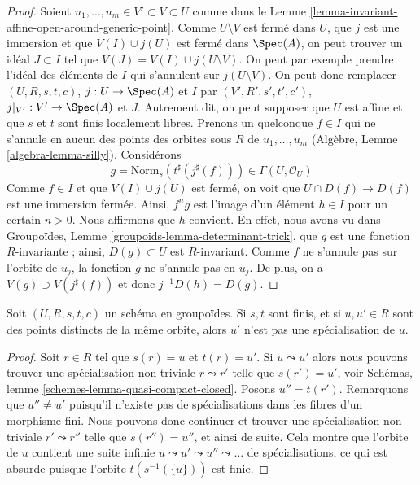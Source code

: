 \begin{proof}
Soient $u_1, \ldots, u_m \in V' \subset V \subset U$ comme dans le
Lemme \ref{lemma-invariant-affine-open-around-generic-point}.
Comme $U \setminus V$ est fermé dans $U$, que $j$ est une immersion et que $V(I) \cup j(U)$
est fermé dans $\Spec(A)$, on peut trouver un idéal
$J \subset I$ tel que $V(J) = V(I) \cup j(U \setminus V)$.
On peut par exemple prendre l'idéal des éléments de $I$ qui
s'annulent sur $j(U \setminus V)$. On peut donc remplacer
$(U, R, s, t, c)$, $j : U \to \Spec(A)$ et $I$ par
$(V', R', s', t', c')$, $j|_{V'} : V' \to \Spec(A)$ et $J$.
Autrement dit, on peut supposer que $U$ est affine et que
$s$ et $t$ sont finis localement libres.
Prenons un quelconque $f \in I$ qui ne s'annule en aucun des
points des orbites sous $R$ de $u_1, \ldots, u_m$
(Algèbre, Lemme \ref{algebra-lemma-silly}). Considérons
$$
g = \text{Norm}_s(t^\sharp(j^\sharp(f))) \in \Gamma(U, \mathcal{O}_U)
$$
Comme $f \in I$ et que $V(I) \cup j(U)$ est fermé, on voit que
$U \cap D(f) \to D(f)$ est une immersion fermée. Ainsi, $f^ng$ est
l'image d'un élément $h \in I$ pour un certain $n > 0$. Nous affirmons que $h$ convient.
En effet, nous avons vu dans
Groupoïdes, Lemme \ref{groupoids-lemma-determinant-trick},
que $g$ est une fonction $R$-invariante ; ainsi, $D(g) \subset U$
est $R$-invariant. Comme $f$ ne s'annule pas sur l'orbite de $u_j$,
la fonction $g$ ne s'annule pas en $u_j$. De plus, on a
$V(g) \supset V(j^\sharp(f))$ et donc $j^{-1}D(h) = D(g)$.
\end{proof}

\begin{lemma}
\label{lemma-no-specializations-map-to-same-point}
Soit $(U, R, s, t, c)$ un schéma en groupoïdes. Si $s, t$ sont finis,
et si $u, u' \in R$ sont des points distincts de la même orbite,
alors $u'$ n'est pas une spécialisation de $u$.
\end{lemma}

\begin{proof}
Soit $r \in R$ tel que $s(r) = u$ et $t(r) = u'$. Si $u \leadsto u'$
alors nous pouvons trouver une spécialisation non triviale $r \leadsto r'$ telle que
$s(r') = u'$, voir 
Schémas, lemme \ref{schemes-lemma-quasi-compact-closed}.
Posons $u'' = t(r')$. Remarquons que $u'' \not = u'$ puisqu'il n'existe pas de
spécialisations dans les fibres d'un morphisme fini.
Nous pouvons donc continuer et trouver une spécialisation non triviale
$r' \leadsto r''$ telle que $s(r'') = u''$, et ainsi de suite. Cela montre que
l'orbite de $u$ contient une suite infinie
$u \leadsto u' \leadsto u'' \leadsto \ldots$
de spécialisations, ce qui est absurde puisque l'orbite
$t(s^{-1}(\{u\}))$ est finie.
\end{proof}

